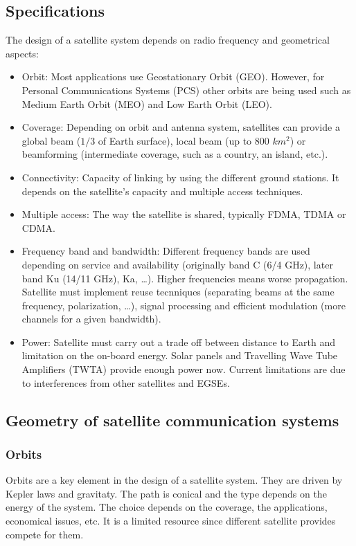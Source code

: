 \documentclass[../main.tex]{subfiles}
\begin{document}
\subsection{Specifications}

The design of a satellite system depends on radio frequency and geometrical aspects:
\begin{itemize}
	\item Orbit: Most applications use Geostationary Orbit (GEO). However, for Personal Communications Systems (PCS) other orbits are being used such as Medium Earth Orbit (MEO) and Low Earth Orbit (LEO).
	\item Coverage: Depending on orbit and antenna system, satellites can provide a global beam ($1/3$ of Earth surface), local beam (up to 800 $km^2$) or beamforming (intermediate coverage, such as a country, an island, etc.).
	\item Connectivity: Capacity of linking by using the different ground stations. It depends on the satellite’s capacity and multiple access techniques.
	\item Multiple access: The way the satellite is shared, typically FDMA, TDMA or CDMA.
	\item Frequency band and bandwidth: Different frequency bands are used depending on service and availability (originally band C (6/4 GHz), later band Ku (14/11 GHz), Ka, \ldots). Higher frequencies means worse propagation. Satellite must implement reuse tecnniques (separating beams at the same frequency, polarization, \ldots), signal processing and efficient modulation (more channels for a given bandwidth).
	\item Power: Satellite must carry out a trade off between distance to Earth and limitation on the on-board energy. Solar panels and Travelling Wave Tube Amplifiers (TWTA) provide enough power now. Current limitations are due to interferences from other satellites and EGSEs.
\end{itemize}

\subsection{Geometry of satellite communication systems}

\subsubsection{Orbits}

Orbits are a key element in the design of a satellite system. They are driven by Kepler laws and gravitaty. The path is conical and the type depends on the energy of the system. The choice depends on the coverage, the applications, economical issues, etc. It is a limited resource since different satellite provides compete for them.
\end{document}
